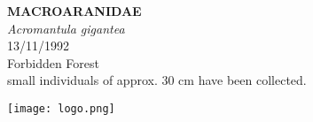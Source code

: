 \documentclass[
  landscape]{article}
\begin{document}
\begin{mdframed}[linecolor=mycolortext, linewidth=2pt, backgroundcolor=mycolor]

  \bigskip
  \begin{flushright}
  \begin{minipage}[t][-50ex][t]{16em}  
  \end{minipage}
  \end{flushright}
  \bigskip
  \begin{adjustwidth}{1cm}{1cm}
  {\fontsize{50pt}{0pt}\selectfont\bf\textcolor{mycolortext}{ MACROARANIDAE }} \\
  \linebreak
  \linebreak
  {\fontsize{40pt}{100pt}\selectfont\textcolor{mycolortext}{\emph{ Acromantula gigantea }}} \\
  \vfill
  {\fontsize{30pt}{100pt}\selectfont\textcolor{mycolortext}{ 13/11/1992 }} \\
  \vfill
  {\fontsize{30pt}{100pt}\selectfont\textcolor{mycolortext}{ Forbidden Forest }} \\
  \vfill
  {\fontsize{30pt}{50pt}\selectfont\textcolor{mycolortext}{ small individuals of approx. 30 cm have been collected. }} \\
  \end{adjustwidth}
  \begin{center}
  \texttt{[image: logo.png]}
  \end{center}
  \end{mdframed}
  \pagebreak

\end{document}
